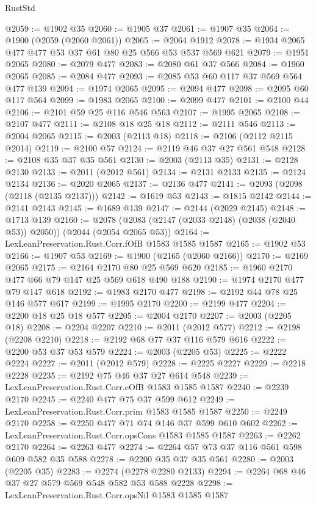 \begin{lexlean}{RustStd}
\begin{coremodule}
@2059 := @1902 @35
@2060 := @1905 @37
@2061 := @1907 @35
@2064 := @1900 (@2059 (@2060 @2061))
@2065 := @2064 @1912
@2078 := @1934 @2065 @477 @477 @53 @37 @61 @80 @25 @566 @53 @537 @569 @621
@2079 := @1951 @2065
@2080 := @2079 @477
@2083 := @2080 @61 @37 @566
@2084 := @1960 @2065
@2085 := @2084 @477
@2093 := @2085 @53 @60 @117 @37 @569 @564 @477 @139
@2094 := @1974 @2065
@2095 := @2094 @477
@2098 := @2095 @60 @117 @564
@2099 := @1983 @2065
@2100 := @2099 @477
@2101 := @2100 @44
@2106 := @2101 @59 @25 @116 @546 @563
@2107 := @1995 @2065
@2108 := @2107 @477
@2111 := @2108 @18 @25 @18
@2112 := @2111 @546
@2113 := @2004 @2065
@2115 := @2003 (@2113 @18)
@2118 := @2106 (@2112 @2115 @2014)
@2119 := @2100 @57
@2124 := @2119 @46 @37 @27 @561 @548
@2128 := @2108 @35 @37 @35 @561
@2130 := @2003 (@2113 @35)
@2131 := @2128 @2130
@2133 := @2011 (@2012 @561)
@2134 := @2131 @2133
@2135 := @2124 @2134
@2136 := @2020 @2065
@2137 := @2136 @477
@2141 := @2093 (@2098 (@2118 (@2135 @2137)))
@2142 := @1619 @53
@2143 := @1815 @2142
@2144 := @2141 @2143
@2145 := @1689 @139
@2147 := @2144 (@2029 @2145)
@2148 := @1713 @139
@2160 := @2078 (@2083 (@2147 (@2033 @2148) (@2038 (@2040 @53)) @2050)) (@2044 (@2054 @2065 @53))
@2164 := LexLeanPreservation.Rust.Corr.fOfB @1583 @1585 @1587
@2165 := @1902 @53
@2166 := @1907 @53
@2169 := @1900 (@2165 (@2060 @2166))
@2170 := @2169 @2065
@2175 := @2164 @2170 @80 @25 @569 @620
@2185 := @1960 @2170 @477 @66 @79 @147 @25 @569 @618 @490 @188
@2190 := @1974 @2170 @477 @79 @147 @618
@2192 := @1983 @2170 @477
@2198 := @2192 @44 @78 @25 @146 @577 @617
@2199 := @1995 @2170
@2200 := @2199 @477
@2204 := @2200 @18 @25 @18 @577
@2205 := @2004 @2170
@2207 := @2003 (@2205 @18)
@2208 := @2204 @2207
@2210 := @2011 (@2012 @577)
@2212 := @2198 (@2208 @2210)
@2218 := @2192 @68 @77 @37 @116 @579 @616
@2222 := @2200 @53 @37 @53 @579
@2224 := @2003 (@2205 @53)
@2225 := @2222 @2224
@2227 := @2011 (@2012 @579)
@2228 := @2225 @2227
@2229 := @2218 @2228
@2235 := @2192 @75 @46 @37 @27 @614 @548
@2239 := LexLeanPreservation.Rust.Corr.eOfB @1583 @1585 @1587
@2240 := @2239 @2170
@2245 := @2240 @477 @75 @37 @599 @612
@2249 := LexLeanPreservation.Rust.Corr.prim @1583 @1585 @1587
@2250 := @2249 @2170
@2258 := @2250 @477 @71 @74 @146 @37 @599 @610 @602
@2262 := LexLeanPreservation.Rust.Corr.opsCons @1583 @1585 @1587
@2263 := @2262 @2170
@2264 := @2263 @477
@2274 := @2264 @57 @73 @37 @116 @561 @598 @609 @582 @35 @588
@2278 := @2200 @35 @37 @35 @561
@2280 := @2003 (@2205 @35)
@2283 := @2274 (@2278 @2280 @2133)
@2294 := @2264 @68 @46 @37 @27 @579 @569 @548 @582 @53 @588 @2228
@2298 := LexLeanPreservation.Rust.Corr.opsNil @1583 @1585 @1587

\end{coremodule}
\end{lexlean}
